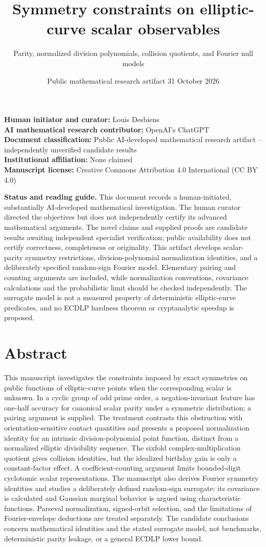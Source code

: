 \documentclass[
  11pt,
  a4paper,
]{article}
\title{Symmetry constraints on elliptic-curve scalar observables}
\subtitle{Parity, normalized division polynomials, collision quotients, and Fourier null models}
\author{}
\date{Public mathematical research artifact \textbar{} 31 October 2026}
\begin{document}
\maketitle

\textbf{Human initiator and curator:} Louis Desbiens\\
\textbf{AI mathematical research contributor:} OpenAI's ChatGPT\\
\textbf{Document classification:} Public AI-developed mathematical
research artifact -- independently unverified candidate results\\
\textbf{Institutional affiliation:} None claimed\\
\textbf{Manuscript license:} Creative Commons Attribution 4.0 International (CC BY 4.0)

\textbf{Status and reading guide.} This document records a
human-initiated, substantially AI-developed mathematical investigation.
The human curator directed the objectives but does not independently
certify its advanced mathematical arguments. The novel claims and
supplied proofs are candidate results awaiting independent specialist
verification; public availability does not certify correctness,
completeness or originality. This artifact develops scalar-parity
symmetry restrictions, division-polynomial normalization identities, and
a deliberately specified random-sign Fourier model. Elementary pairing
and counting arguments are included, while normalization conventions,
covariance calculations and the probabilistic limit should be checked
independently. The surrogate model is not a measured property of
deterministic elliptic-curve predicates, and no ECDLP hardness theorem
or cryptanalytic speedup is proposed.

\section{Abstract}\label{abstract}

This manuscript investigates the constraints imposed by exact symmetries
on public functions of elliptic-curve points when the corresponding
scalar is unknown. In a cyclic group of odd prime order, a
negation-invariant feature has one-half accuracy for canonical scalar
parity under a symmetric distribution; a pairing argument is supplied.
The treatment contrasts this obstruction with orientation-sensitive
contact quantities and presents a proposed normalization identity for an
intrinsic division-polynomial point function, distinct from a normalized
elliptic divisibility sequence. The sixfold complex-multiplication
quotient gives collision identities, but the idealized birthday gain is
only a constant-factor effect. A coefficient-counting argument limits
bounded-digit cyclotomic scalar representations. The manuscript also
derives Fourier symmetry identities and studies a deliberately defined
random-sign surrogate: its covariance is calculated and Gaussian
marginal behavior is argued using characteristic functions. Parseval
normalization, signed-orbit selection, and the limitations of
Fourier-envelope deductions are treated separately. The candidate
conclusions concern mathematical identities and the stated surrogate
model, not benchmarks, deterministic parity leakage, or a general ECDLP
lower bound.
\end{document}
